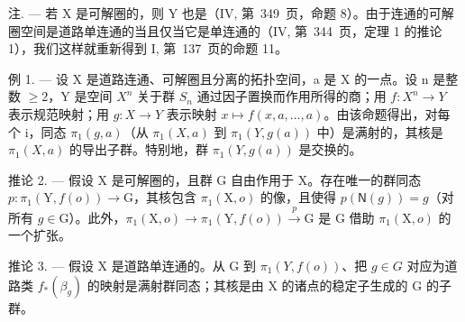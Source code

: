 注. --- 若 X 是可解圈的，则 Y 也是（IV, 第~349~页，命题 8）。由于连通的可解圈空间是道路单连通的当且仅当它是单连通的（IV, 第~344~页，定理 1 的推论 1），我们这样就重新得到 I, 第~137~页的命题 11。

例 1. --- 设 X 是道路连通、可解圈且分离的拓扑空间，a 是 X 的一点。设 n 是整数 \(\geqslant 2\)，Y 是空间 \(X^{n}\) 关于群 \(S_{n}\) 通过因子置换而作用所得的商；用 \(f: X^{n} \to Y\) 表示规范映射；用 \(g: X \to Y\) 表示映射 \(x \mapsto f(x, a, \ldots, a)\)。由该命题得出，对每个 i，同态 \(\pi_{1}(g, a)\)（从 \(\pi_{1}(X, a)\) 到 \(\pi_{1}(Y, g(a))\) 中）是满射的，其核是 \(\pi_{1}(X, a)\) 的导出子群。特别地，群 \(\pi_{1}(Y, g(a))\) 是交换的。

推论 2. --- 假设 X 是可解圈的，且群 G 自由作用于 X。存在唯一的群同态 \(p \colon \pi_1(\mathrm{Y}, f(o)) \to \mathrm{G}\)，其核包含 \(\pi_1(\mathrm{X}, o)\) 的像，且使得 \(p(\mathsf{N}(g)) = g\)（对所有 \(g \in \mathrm{G}\)）。此外，\(\pi_1(\mathrm{X}, o) \to \pi_1(\mathrm{Y}, f(o)) \xrightarrow{p} \mathrm{G}\) 是 G 借助 \(\pi_1(\mathrm{X}, o)\) 的一个扩张。

推论 3. --- 假设 X 是道路单连通的。从 G 到 \(\pi_1(Y, f(o))\)、把 \(g \in G\) 对应为道路类 \(f_*(\beta_g)\) 的映射是满射群同态；其核是由 X 的诸点的稳定子生成的 G 的子群。

